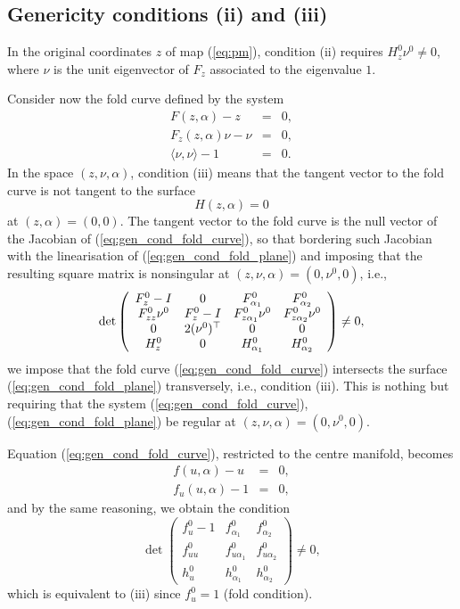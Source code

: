 \documentclass[final,onefignum]{siamltex}
\begin{document}
\subsection{Genericity conditions (ii) and (iii)}
In the original coordinates $z$ of map (\ref{eq:pm}), condition (ii) requires $H_z^0\nu^0\neq0$, where $\nu$ is the unit eigenvector of $F_z$ associated to the eigenvalue $1$.  

Consider now the fold curve defined by the system
\begin{equation}
\label{eq:gen_cond_fold_curve}
\begin{array}{rcl}
 F(z,\alpha)-z & = & 0,\\
 F_z(z,\alpha)\nu - \nu & = & 0,\\
 \langle \nu,\nu\rangle-1 & = & 0.
\end{array}
\end{equation}
In the space $(z,\nu,\alpha)$, condition (iii) means that the tangent vector to the fold curve is not tangent to the surface 
\begin{equation}
\label{eq:gen_cond_fold_plane}
H(z,\alpha)=0
\end{equation}
at $(z,\alpha)=(0,0)$.  The tangent vector to the fold curve is the null vector of the Jacobian of (\ref{eq:gen_cond_fold_curve}), so that bordering such Jacobian with the linearisation of (\ref{eq:gen_cond_fold_plane}) and imposing that the resulting square matrix is nonsingular at $(z,\nu,\alpha)=(0,\nu^0,0)$, i.e.,
$$
\det
\left(
\begin{array}{cccc}
F^0_z-I & 0 & F^0_{\alpha_1} & F^0_{\alpha_2}\\
F_{zz}^0\nu^0 & F^0_z-I &  F_{z\alpha_1}^0\nu^0 & F_{z\alpha_2}^0\nu^0\\
0 & 2(\nu^0){^{{\scriptscriptstyle}\top}} & 0 & 0\\
H^0_z & 0 & H^0_{\alpha_1} & H^0_{\alpha_2}
\end{array}
\right)\neq 0,
$$
we impose that the fold curve (\ref{eq:gen_cond_fold_curve}) intersects the surface (\ref{eq:gen_cond_fold_plane}) transversely, i.e., condition (iii).  This is nothing but requiring that the system (\ref{eq:gen_cond_fold_curve}), (\ref{eq:gen_cond_fold_plane}) be regular at $(z,\nu,\alpha)=(0,\nu^0,0)$. 

Equation (\ref{eq:gen_cond_fold_curve}), restricted to the centre manifold, becomes
$$
\begin{array}{rcl}
 f(u,\alpha)-u & = & 0,\\
 f_u(u,\alpha) - 1 & = & 0,
\end{array}
$$
and by the same reasoning, we obtain the condition 
$$
\det
\left(
\begin{array}{ccc}
f^0_u-1 & f^0_{\alpha_1} & f^0_{\alpha_2} \\
f^0_{uu} & f^0_{u\alpha_1} & f^0_{u\alpha_2}\\
h^0_u & h^0_{\alpha_1} & h^0_{\alpha_2}
\end{array}
\right)\neq 0,
$$
which is equivalent to (iii) since $f_u^0=1$ (fold condition).
\end{document}
